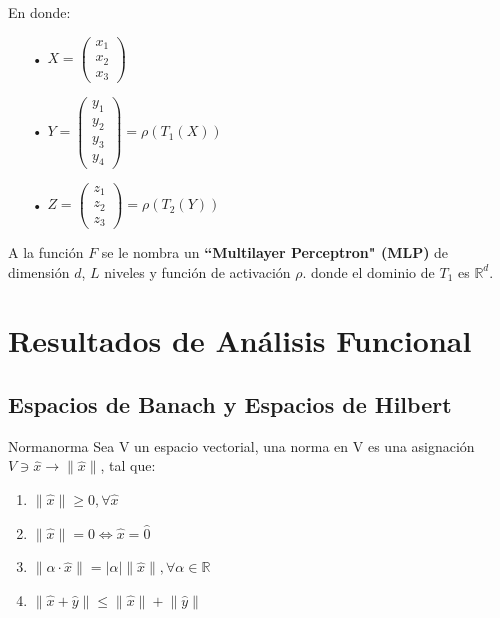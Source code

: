 \documentclass[12pt,a4paper]{book}
\providecommand{\abs}[1]{\lvert#1\rvert}
\providecommand{\norm}[1]{\lVert#1\rVert}
\begin{document}
En donde:
\begin{enumerate}
\item[•] $X=\left(\begin{matrix}
x_{1}\\
x_{2}\\
x_{3}
\end{matrix}\right)$
\item[•] $Y=\left(\begin{matrix}
y_{1}\\
y_{2}\\
y_{3}\\
y_{4}
\end{matrix}\right)=\rho(T_{1}(X))$
\item[•] $Z=\left(\begin{matrix}
z_{1}\\
z_{2}\\
z_{3}
\end{matrix}\right)=\rho(T_{2}(Y))$
\end{enumerate}

A la función $F$ se le nombra un \textbf{``Multilayer Perceptron" (MLP)} de dimensión $d$, $L$ niveles y función de activación $\rho$. donde el dominio de $T_{1}$ es $\mathbb{R}^{d}$.
\chapter{Resultados de Análisis Funcional}

\section{Espacios de Banach y Espacios de Hilbert}

\begin{definicion}{Norma}{norma}
Sea V un espacio vectorial, una norma en V es una asignación $V\ni \widehat{x}\rightarrow \lVert \widehat x \rVert$, tal que:
\begin{enumerate}
\item $\norm{\widehat{x}}\geq 0, \forall \widehat{x}$
\item $\norm{\widehat{x}}=0\Leftrightarrow \widehat{x}=\widehat{0}$
\item $\norm{\alpha\cdot\widehat{x}}=\abs{\alpha}\norm{\widehat{x}}, \forall\alpha\in\mathbb{R}$
\item $\norm{\widehat{x}+\widehat{y}}\leq\norm{\widehat{x}}+\norm{\widehat{y}}$ 
\end{enumerate}
\end{definicion}
\end{document}
